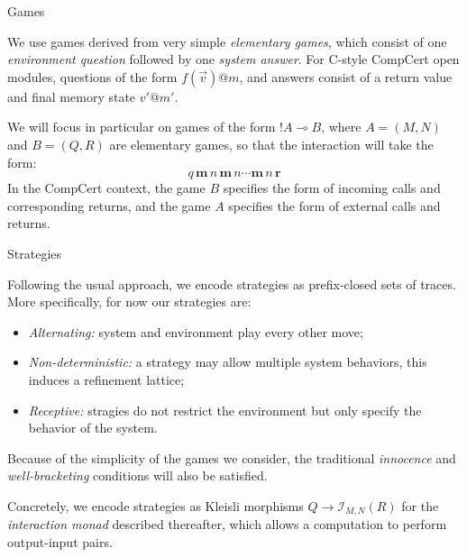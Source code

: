 \documentclass{beamer}
\begin{document}
\begin{frame}{Games} %

We use games derived from very simple
\emph{elementary games},
which consist of
one \emph{environment question} followed by
one \emph{system answer}.
For C-style CompCert open modules,
questions of the form $f(\vec{v})@m$, and
answers consist of a return value and final memory state $v'@m'$.
\vfill

We will focus in particular on games of the form $!A \multimap B$,
where $A = (M, N)$ and $B = (Q, R)$ are elementary games,
so that the interaction will take the form:
\[
    q \, \mathbf{m} \, n \, \mathbf{m} \, n \cdots \mathbf{m} \, n \, \mathbf{r}
\]
In the CompCert context,
the game $B$ specifies the form of incoming calls and corresponding returns,
and the game $A$ specifies the form of external calls and returns.
\vfill

\end{frame}

\begin{frame}{Strategies} %

Following the usual approach,
we encode strategies as prefix-closed sets of traces.
More specifically,
for now our strategies are:
\begin{itemize}
\item \emph{Alternating:}
  system and environment play every other move;
\item \emph{Non-deterministic:}
  a strategy may allow multiple system behaviors,
  this induces a refinement lattice;
\item \emph{Receptive:}
  stragies do not restrict the environment
  but only specify the behavior of the system.
\end{itemize}
Because of the simplicity of the games we consider,
the traditional \emph{innocence} and \emph{well-bracketing} conditions
will also be satisfied.
\vfill

Concretely, we encode strategies as Kleisli morphisms
$Q \rightarrow \mathcal{I}_{M,N}(R)$ for the
\emph{interaction monad} described thereafter,
which allows a computation to perform output-input pairs.
\vfill

\end{frame}
\end{document}
